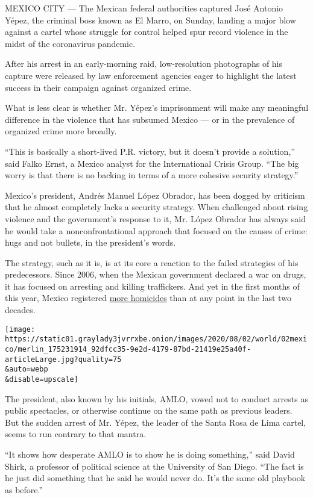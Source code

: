 MEXICO CITY --- The Mexican federal authorities captured José Antonio
Yépez, the criminal boss known as El Marro, on Sunday, landing a major
blow against a cartel whose struggle for control helped spur record
violence in the midst of the coronavirus pandemic.

After his arrest in an early-morning raid, low-resolution photographs of
his capture were released by law enforcement agencies eager to highlight
the latest success in their campaign against organized crime.

What is less clear is whether Mr. Yépez's imprisonment will make any
meaningful difference in the violence that has subsumed Mexico --- or in
the prevalence of organized crime more broadly.

``This is basically a short-lived P.R. victory, but it doesn't provide a
solution,'' said Falko Ernst, a Mexico analyst for the International
Crisis Group. ``The big worry is that there is no backing in terms of a
more cohesive security strategy.''

Mexico's president, Andrés Manuel López Obrador, has been dogged by
criticism that he almost completely lacks a security strategy. When
challenged about rising violence and the government's response to it,
Mr. López Obrador has always said he would take a nonconfrontational
approach that focused on the causes of crime: hugs and not bullets, in
the president's words.

The strategy, such as it is, is at its core a reaction to the failed
strategies of his predecessors. Since 2006, when the Mexican government
declared a war on drugs, it has focused on arresting and killing
traffickers. And yet in the first months of this year, Mexico registered
\href{https://www.reuters.com/article/us-mexico-violence/murders-in-mexico-reach-record-levels-in-first-four-months-of-2020-idUSKBN22W2JC}{more
homicides} than at any point in the last two decades.

\texttt{[image: https://static01.graylady3jvrrxbe.onion/images/2020/08/02/world/02mexico/merlin\_175231914\_92dfcc35-9e2d-4179-87bd-21419e25a40f-articleLarge.jpg?quality=75\\\&auto=webp\\\&disable=upscale]}

The president, also known by his initials, AMLO, vowed not to conduct
arrests as public spectacles, or otherwise continue on the same path as
previous leaders. But the sudden arrest of Mr. Yépez, the leader of the
Santa Rosa de Lima cartel, seems to run contrary to that mantra.

``It shows how desperate AMLO is to show he is doing something,'' said
David Shirk, a professor of political science at the University of San
Diego. ``The fact is he just did something that he said he would never
do. It's the same old playbook as before.''


